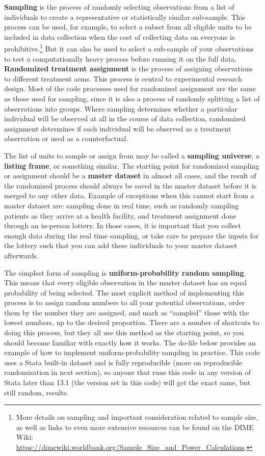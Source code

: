 \documentclass[
]{book}
\begin{document}
\textbf{Sampling} is the process of randomly selecting observations
from a list of individuals to create a representative or statistically similar sub-sample.
This process can be used, for example, to select a subset from all eligible units
to be included in data collection when the cost of collecting data on everyone is prohibitive.\footnote{More details on sampling and important consideration related to sample size,
  as well as links to even more extensive resources
  can be found on the DIME Wiki:
  \url{https://dimewiki.worldbank.org/Sample_Size_and_Power_Calculations}.}
But it can also be used to select a sub-sample of your observations to test a computationally heavy process
before running it on the full data.
\textbf{Randomized treatment assignment} is the process of assigning observations to different treatment arms.
This process is central to experimental research design.
Most of the code processes used for randomized assignment are the same as those used for sampling,
since it is also a process of randomly splitting a list of observations into groups.
Where sampling determines whether a particular individual
will be observed at all in the course of data collection,
randomized assignment determines if each individual will be observed
as a treatment observation or used as a counterfactual.

The list of units to sample or assign from may be called a \textbf{sampling universe},
a \textbf{listing frame}, or something similar.
The starting point for randomized sampling or assignment
should be a \textbf{master dataset} in almost all cases,
and the result of the randomized process should always be saved in the master dataset
before it is merged to any other data.
Example of exceptions
when this cannot start from a master dataset are:
sampling done in real time, such as randomly sampling patients
as they arrive at a health facility, and
treatment assignment done through an in-person lottery.
In those cases,
it is important that you collect enough data
during the real time sampling,
or take care to prepare the inputs for the lottery
such that you can add these individuals
to your master dataset afterwards.

The simplest form of sampling is
\textbf{uniform-probability random sampling}.
This means that every eligible observation in the master dataset
has an equal probability of being selected.
The most explicit method of implementing this process
is to assign random numbers to all your potential observations,
order them by the number they are assigned,
and mark as ``sampled'' those with the lowest numbers, up to the desired proportion.
There are a number of shortcuts to doing this process,
but they all use this method as the starting point,
so you should become familiar with exactly how it works.
The do-file below provides an example of
how to implement uniform-probability sampling in practice.
This code uses a Stata built-in dataset and is fully reproducible
(more on reproducible randomization in next section),
so anyone that runs this code in any version of Stata later than 13.1
(the version set in this code)
will get the exact same, but still random, results.
\end{document}
